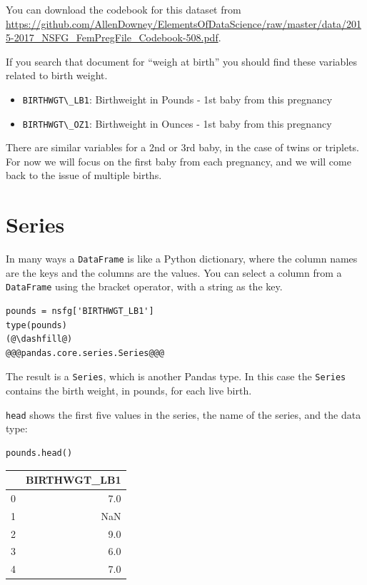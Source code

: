 You can download the codebook for this dataset from
\url{https://github.com/AllenDowney/ElementsOfDataScience/raw/master/data/2015-2017_NSFG_FemPregFile_Codebook-508.pdf}.

If you search that document for ``weigh at birth'' you should find these
variables related to birth weight.

\begin{itemize}
\item
  \passthrough{\lstinline!BIRTHWGT\_LB1!}: Birthweight in Pounds - 1st
  baby from this pregnancy
\item
  \passthrough{\lstinline!BIRTHWGT\_OZ1!}: Birthweight in Ounces - 1st
  baby from this pregnancy
\end{itemize}

There are similar variables for a 2nd or 3rd baby, in the case of twins
or triplets. For now we will focus on the first baby from each
pregnancy, and we will come back to the issue of multiple births.

\hypertarget{series}{%
\section{Series}\label{series}}

In many ways a \passthrough{\lstinline!DataFrame!} is like a Python
dictionary, where the column names are the keys and the columns are the
values. You can select a column from a
\passthrough{\lstinline!DataFrame!} using the bracket operator, with a
string as the key.

\begin{lstlisting}[]
pounds = nsfg['BIRTHWGT_LB1']
type(pounds)
(@\dashfill@)
@@@pandas.core.series.Series@@@
\end{lstlisting}

The result is a \passthrough{\lstinline!Series!}, which is another
Pandas type. In this case the \passthrough{\lstinline!Series!} contains
the birth weight, in pounds, for each live birth.

\passthrough{\lstinline!head!} shows the first five values in the
series, the name of the series, and the data type:

\begin{lstlisting}[]
pounds.head()
\end{lstlisting}

\begin{tabular}{lr}
\midrule
{} &  BIRTHWGT\_LB1 \\
\midrule
0 &           7.0 \\
1 &           NaN \\
2 &           9.0 \\
3 &           6.0 \\
4 &           7.0 \\
\midrule
\end{tabular}

